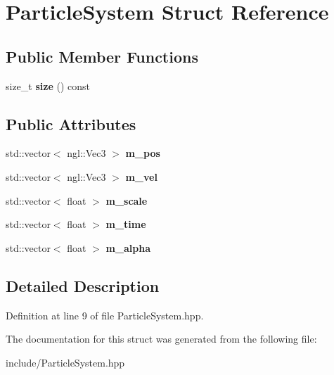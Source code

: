 \hypertarget{struct_particle_system}{}\section{Particle\+System Struct Reference}
\label{struct_particle_system}
\subsection*{Public Member Functions}
\begin{DoxyCompactItemize}
\item 
\hypertarget{struct_particle_system_a001e74765b9d71fb78c527fb7feacdb9}{}size\+\_\+t {\bfseries size} () const \label{struct_particle_system_a001e74765b9d71fb78c527fb7feacdb9}

\end{DoxyCompactItemize}
\subsection*{Public Attributes}
\begin{DoxyCompactItemize}
\item 
\hypertarget{struct_particle_system_ad2e80f5727d30e9d1c81bd3574f83e7d}{}std\+::vector$<$ ngl\+::\+Vec3 $>$ {\bfseries m\+\_\+pos}\label{struct_particle_system_ad2e80f5727d30e9d1c81bd3574f83e7d}

\item 
\hypertarget{struct_particle_system_af8ca816dee4bff1e5d5db2d5d8836189}{}std\+::vector$<$ ngl\+::\+Vec3 $>$ {\bfseries m\+\_\+vel}\label{struct_particle_system_af8ca816dee4bff1e5d5db2d5d8836189}

\item 
\hypertarget{struct_particle_system_ac8c9405648efb0eac53f3be180875fcb}{}std\+::vector$<$ float $>$ {\bfseries m\+\_\+scale}\label{struct_particle_system_ac8c9405648efb0eac53f3be180875fcb}

\item 
\hypertarget{struct_particle_system_af7e38a26977462fe8355dcb36c6d07f4}{}std\+::vector$<$ float $>$ {\bfseries m\+\_\+time}\label{struct_particle_system_af7e38a26977462fe8355dcb36c6d07f4}

\item 
\hypertarget{struct_particle_system_ace9ee7973ab4ddb23d8a11bde1e932a7}{}std\+::vector$<$ float $>$ {\bfseries m\+\_\+alpha}\label{struct_particle_system_ace9ee7973ab4ddb23d8a11bde1e932a7}

\end{DoxyCompactItemize}


\subsection{Detailed Description}


Definition at line 9 of file Particle\+System.\+hpp.



The documentation for this struct was generated from the following file\+:\begin{DoxyCompactItemize}
\item 
include/Particle\+System.\+hpp\end{DoxyCompactItemize}
